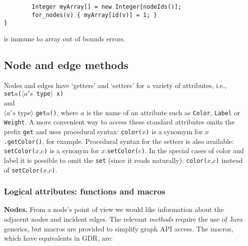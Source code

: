 \begin{minipage}{0.8\textwidth}
\begin{verbatim}
        Integer myArray[] = new Integer[nodeIds()];
        for_nodes(v) { myArray[id(v)] = 1; }
}
\end{verbatim}
\end{minipage}

is immune to array out of bounds errors.

\subsection{Node and edge methods}

Nodes and edges have `getters' and `setters' for
a variety of attributes, i.e.,
\\
\texttt{set}$a$\texttt{($\langle a's$ type$\rangle$ x)}
\\
and
\\
$\langle a's$ type$\rangle$ \texttt{get}$a$\texttt{()},
where $a$ is the name of an attribute such as
\texttt{Color},
\texttt{Label} or \texttt{Weight}.
A more convenient way to access these standard attributes omits the prefix \texttt{get}
and uses procedural syntax:
\texttt{color(}$x$\texttt{)} is a synomym for $x$\texttt{.getColor()}, for example.
Procedural syntax for the setters is also available:
\texttt{setColor(}$x$,$c$\texttt{)} is a synonym for $x$.\texttt{setColor(}$c$\texttt{)}.
In the special cases of color and label it is possible to omit the \texttt{set}
(since it reads naturally): \texttt{color(}$x$,$c$\texttt{)} instead of \texttt{setColor(}$x$,$c$\texttt{)}.

\subsubsection{Logical attributes: functions and macros}

\textbf{Nodes.}
From a node's point of view we would like information about the adjacent nodes and incident edges.
The relevant \emph{methods} require the use of Java generics, but macros are provided
to simplify graph API access. The macros, which have equivalents in GDR, are:

